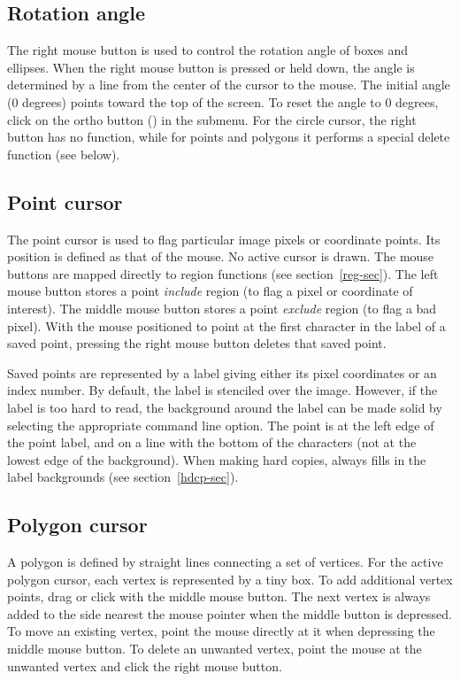 \subsection{ Rotation angle }

The right mouse button is used to control the rotation angle of boxes
and ellipses.  When the right mouse button is pressed or held down, the
angle is determined by a line from the center of the cursor to the mouse.
The initial angle (0 degrees) points toward the top of the screen.  To
reset the angle to 0 degrees, click on the ortho button ()
in the  submenu.  For the circle cursor, the right button has no
function, while for points and polygons it performs a special delete
function (see below).

\subsection{ Point cursor }

The point cursor is used to flag particular image pixels or coordinate
points.  Its position is defined as that of the mouse.  No active cursor
is drawn.  The mouse buttons are mapped directly to region functions (see
section~\ref{reg-sec}).  The left mouse button stores a point {\em include} region (to flag a
pixel or coordinate of interest).  The middle mouse button stores a point
{\em exclude} region (to flag a bad pixel).  With the mouse positioned to point
at the first character in the label of a saved point, pressing the right
mouse button deletes that saved point.

Saved points are represented by a label giving either its pixel coordinates
or an index number.  By default, the label is stenciled over the image.
However, if the label is too hard to read, the background around the label
can be made solid by selecting the appropriate command line option.  The
point is at the left edge of the point label, and on a line with the
bottom of the characters (not at the lowest edge of the background).  When
making hard copies, {\SAO} always fills in the label backgrounds
(see section~\ref{hdcp-sec}).

\subsection{ Polygon cursor }

A polygon is defined by straight lines connecting a set of vertices.  For
the active polygon cursor, each vertex is represented by a tiny box.  To
add additional vertex points, drag or click with the middle mouse button.
The next vertex is always added to the side nearest the mouse pointer when
the middle button is depressed.  To move an existing vertex, point the
mouse directly at it when depressing the middle mouse button.  To delete an
unwanted vertex, point the mouse at the unwanted vertex and click
the right mouse button.


